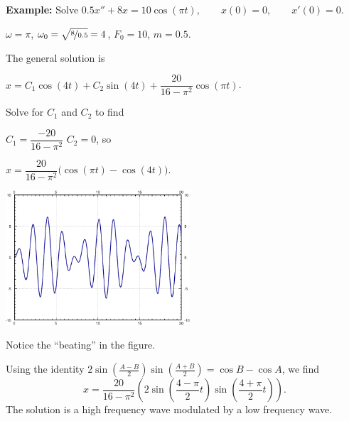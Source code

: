 \documentclass[10pt,aspectratio=169]{beamer}
\begin{document}
\begin{frame}

\textbf{Example:}
Solve \qquad
$0.5 x'' + 8 x = 10 \cos (\pi t), \qquad x(0)=0, \qquad x'(0)=0$.

\medskip
\pause

$\omega = \pi$, $\omega_0 = \sqrt{\nicefrac{8}{0.5}} = 4$, $F_0 = 10$,
$m=0.5$.

\pause

The general solution is

\medskip

\quad $x = C_1 \cos (4 t) + C_2 \sin (4 t) +
\dfrac{20}{16 - \pi^2} \cos (\pi t)$.

\pause
\medskip

Solve for $C_1$ and $C_2$ to find

\medskip

\quad $C_1 = \dfrac{-20}{16 - \pi^2}$ \quad $C_2 = 0$, \quad so

\pause
\medskip

\quad $x = 
\dfrac{20}{16 - \pi^2} \bigl( \cos (\pi t)- \cos (4 t) \bigr)$.

\vspace*{-1.7in}
\hfill\includegraphics[width=2.7in]{../figures/3-6-beating.pdf}

\vspace*{-0.2in}
\pause

Notice the ``beating'' in the figure.

\medskip
\pause

Using the
identity
\quad
$
2\sin \left( \frac{A-B}{2} \right) \sin \left( \frac{A+B}{2} \right) =
\cos B -\cos A
$,
\quad 
we find
\[
x = 
\frac{20}{16 - \pi^2} \left( 2 \sin \left(\frac{4-\pi}{2} t \right)
\sin \left( \frac{4+\pi}{2} t \right) \right) .
\]
\pause
The solution is a high frequency wave modulated by a low frequency
wave.
\end{frame}
\end{document}

